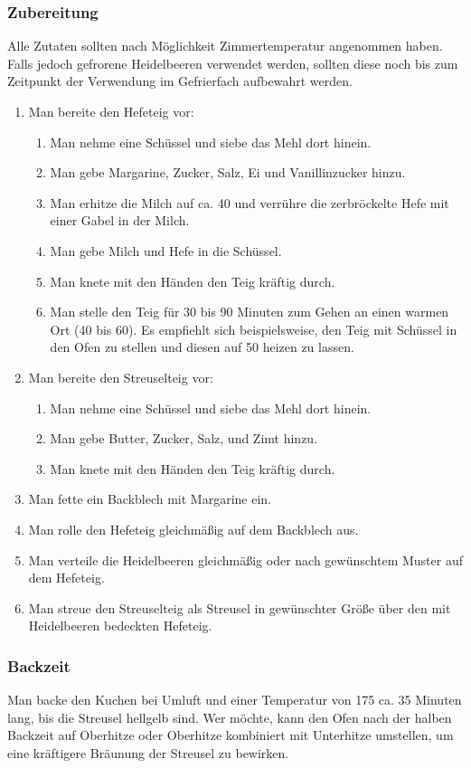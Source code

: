 \documentclass[a4paper]{book}
\begin{document}
\subsubsection{Zubereitung}
Alle Zutaten sollten nach Möglichkeit Zimmertemperatur angenommen haben. Falls jedoch gefrorene Heidelbeeren verwendet werden, sollten diese noch bis zum Zeitpunkt der Verwendung im Gefrierfach aufbewahrt werden.
\begin{enumerate}[(1)]
	\item Man bereite den Hefeteig vor:
	\begin{enumerate}[(\theenumi.1)]
		\item Man nehme eine Schüssel und siebe das Mehl dort hinein.
		\item Man gebe Margarine, Zucker, Salz, Ei und Vanillinzucker hinzu.
		\item Man erhitze die Milch auf ca. 40{\textcelsius} und verrühre die zerbröckelte Hefe mit einer Gabel in der Milch.
		\item Man gebe Milch und Hefe in die Schüssel.
		\item Man knete mit den Händen den Teig kräftig durch.
		\item Man stelle den Teig für 30 bis 90 Minuten zum Gehen an einen warmen Ort (40{\textcelsius} bis 60{\textcelsius}). Es empfiehlt sich beispielsweise, den Teig mit Schüssel in den Ofen zu stellen und diesen auf 50{\textcelsius} heizen zu lassen.
	\end{enumerate}
	\item Man bereite den Streuselteig vor:
	\begin{enumerate}[(\theenumi.1)]
		\item Man nehme eine Schüssel und siebe das Mehl dort hinein. 
		\item Man gebe Butter, Zucker, Salz, und Zimt hinzu.
		\item Man knete mit den Händen den Teig kräftig durch.
	\end{enumerate}
	\item Man fette ein Backblech mit Margarine ein.
	\item Man rolle den Hefeteig gleichmäßig auf dem Backblech aus.
	\item Man verteile die Heidelbeeren gleichmäßig oder nach gewünschtem Muster auf dem Hefeteig.
	\item Man streue den Streuselteig als Streusel in gewünschter Größe über den mit Heidelbeeren bedeckten Hefeteig.

\end{enumerate}
\subsubsection{Backzeit}
	Man backe den Kuchen bei Umluft und einer Temperatur von 175{\textcelsius} ca. 35 Minuten lang, bis die Streusel hellgelb sind. Wer möchte, kann den Ofen nach der halben Backzeit auf Oberhitze oder Oberhitze kombiniert mit Unterhitze umstellen, um eine kräftigere Bräunung der Streusel zu bewirken.
\end{document}
